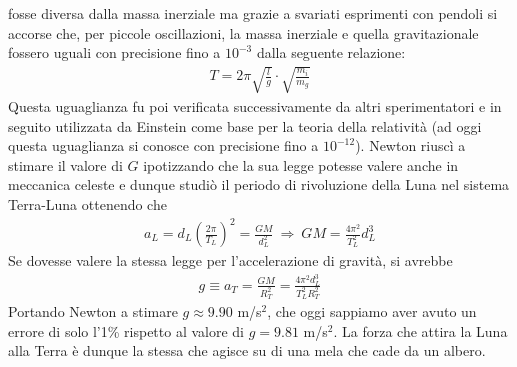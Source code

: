 \documentclass[a4paper, oneside]{book}
\begin{document}
fosse diversa dalla massa inerziale ma grazie a svariati esprimenti con pendoli
si accorse che, per piccole oscillazioni, la massa inerziale e quella gravitazionale fossero
uguali con precisione fino a $10^{-3}$ dalla seguente relazione:
\begin{gather*}
    T = 2\pi \sqrt{\frac{l}{g}} \cdot \sqrt{\frac{m_i}{m_g}}  
\end{gather*}
Questa uguaglianza fu poi verificata successivamente da altri sperimentatori e in seguito utilizzata da Einstein come base
per la teoria della relatività (ad oggi questa uguaglianza si conosce con precisione fino a $10^{-12}$).
Newton riuscì a stimare il valore di $G$ ipotizzando che la sua legge potesse valere anche 
in meccanica celeste e dunque studiò il periodo di rivoluzione della Luna nel sistema Terra-Luna
ottenendo che
\begin{gather*}
    a_L = d_L\left(\frac{2\pi}{T_L}\right)^{2} = \frac{GM}{d_L^{2}} \ \Longrightarrow \ GM = \frac{4\pi^{2}}{T_L^{2}} d_L^{3}
\end{gather*} 
Se dovesse valere la stessa legge per l'accelerazione di gravità, si avrebbe
\begin{gather*}
    g \equiv a_T = \frac{GM}{R_T^{2}} = \frac{4\pi^{2}d_L^{3}}{T_L^{2}R_T^{2}}
\end{gather*}
Portando Newton a stimare $g \approx 9.90$ m/s$^{2}$, che oggi sappiamo aver avuto 
un errore di solo l'1\% rispetto al valore di $g = 9.81$ m/s$^{2}$. La forza che 
attira la Luna alla Terra è dunque la stessa che agisce su di una mela 
che cade da un albero.

\clearpage
\end{document}
